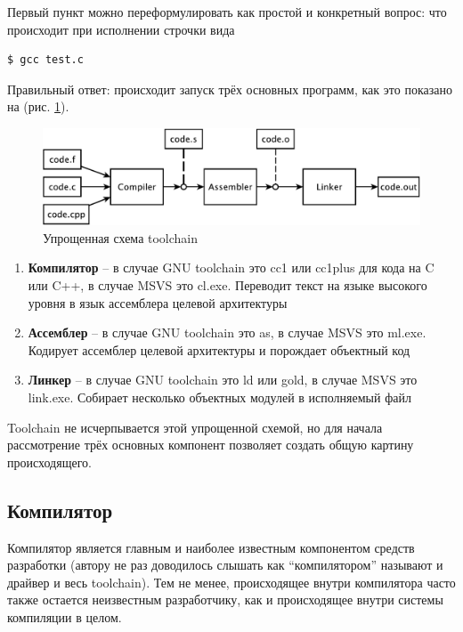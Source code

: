 \documentclass[a4paper,12pt,oneside]{article}
\begin{document}
Первый пункт можно переформулировать как простой и конкретный вопрос: что происходит при исполнении строчки вида

\begin{verbatim}
$ gcc test.c
\end{verbatim}

Правильный ответ: происходит запуск трёх основных программ, как это показано на (рис. \ref{fig:simplified_scheme}).

\begin{figure}[ht]
\centering
\includegraphics[width=1.0\textwidth]{illustrations/simplified-scheme-crop.pdf}
\caption{Упрощенная схема toolchain}
\label{fig:simplified_scheme}
\end{figure}

\begin{enumerate}
\item \textbf{Компилятор} -- в случае GNU toolchain это cc1 или cc1plus для кода на C или C++, в случае MSVS это cl.exe. Переводит текст на языке высокого уровня в язык ассемблера целевой архитектуры
\item \textbf{Ассемблер} -- в случае GNU toolchain это as, в случае MSVS это ml.exe. Кодирует ассемблер целевой архитектуры и порождает объектный код
\item \textbf{Линкер} -- в случае GNU toolchain это ld или gold, в случае MSVS это link.exe. Собирает несколько объектных модулей в исполняемый файл
\end{enumerate}

Toolchain не исчерпывается этой упрощенной схемой, но для начала рассмотрение трёх основных компонент позволяет создать общую картину происходящего.

\subsection{Компилятор}

Компилятор является главным и наиболее известным компонентом средств разработки (автору не раз доводилось слышать как ``компилятором'' называют и драйвер и весь toolchain). Тем не менее, происходящее внутри компилятора часто также остается неизвестным разработчику, как и происходящее внутри системы компиляции в целом.
\end{document}
